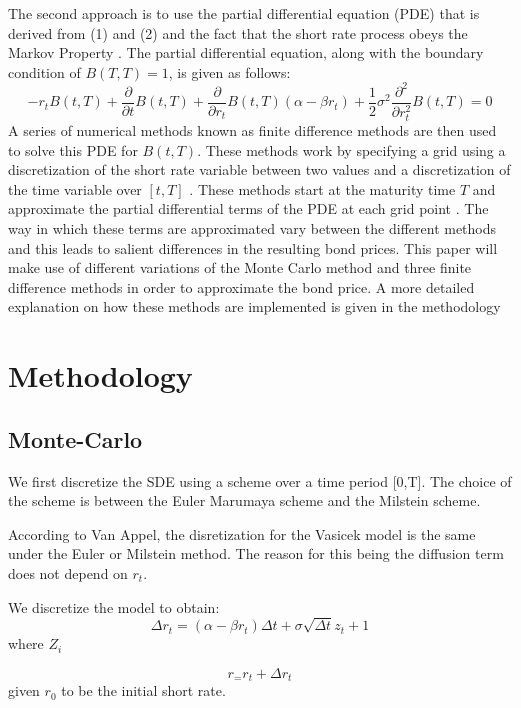 \documentclass[12pt,a4paper]{article}
\begin{document}
The second approach is to use the partial differential equation (PDE) that is derived from (1) and (2) and the fact that the short rate process obeys the Markov Property \citep{mamon2004three}. The partial differential equation, along with the  boundary condition of $B(T,T) = 1$, is given as follows:
\begin{equation}
-r_t B(t,T) + \frac{\partial}{\partial t} B(t,T) + \frac{\partial}{\partial r_t}B(t,T)(\alpha - \beta r_t) +\frac{1}{2} \sigma^2 \frac{\partial^2}{\partial r_t^2} B(t,T) = 0 
\end{equation}
A series of numerical methods known as finite difference methods are then used to solve this PDE for $B(t,T)$. These methods work by specifying a grid using a discretization of the short rate variable between two values and a discretization of the time variable over $[t,T]$ \citep{ketsise2006monitoring}. These methods start at the maturity time $T$ and approximate the partial differential terms of the PDE at each grid point \citep{crank}. The way in which these terms are approximated vary between the different methods and this leads to salient differences in the resulting bond prices. This paper will make use of different variations of the Monte Carlo method and three finite difference methods in order to approximate the bond price. A more detailed explanation on how these methods are implemented is given in the methodology


\newpage
\section{Methodology}
\label{sec: Method}


\subsection{Monte-Carlo}

We first discretize the SDE using a scheme over a time period [0,T]. The choice of the scheme is between the Euler Marumaya scheme and the Milstein scheme.
	
According to Van Appel, the disretization for the Vasicek model is the same under the Euler or Milstein method. The reason for this being the diffusion term does not depend on $r_t$.  
	
We discretize the model to obtain:
$$ \Delta r_t= (\alpha-\beta r_t)\Delta t+ \sigma \sqrt{\Delta t} z_t+1$$ where $Z_i$
	
$$r_=r_t+\Delta r_t$$ given $r_0$ to be the initial short rate.
	
\end{document}
